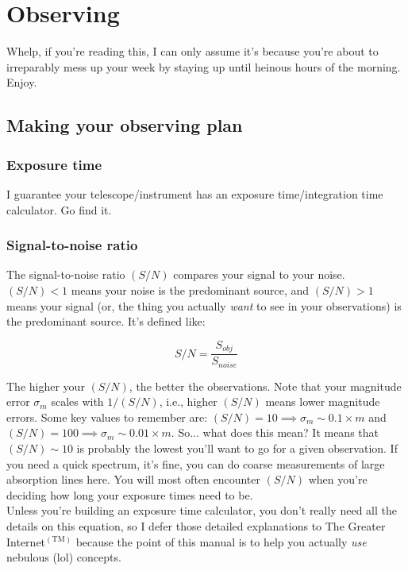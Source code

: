 \section{Observing}
Whelp, if you're reading this, I can only assume it's because you're about to irreparably mess up your week by staying up until heinous hours of the morning. Enjoy. 

\subsection{Making your observing plan}
\subsubsection{Exposure time}
I guarantee your telescope/instrument has an exposure time/integration time calculator. Go find it. 

\subsubsection{Signal-to-noise ratio}
The signal-to-noise ratio $(S/N)$ compares your signal to your noise. $(S/N) < 1$ means your noise is the predominant source, and $(S/N) > 1$ means your signal (or, the thing you actually \textit{want} to see in your observations) is the predominant source. It's defined like:

\begin{equation}
    S/N = \frac{S_{obj}}{S_{noise}}
\end{equation}

The higher your $(S/N)$, the better the observations. Note that your magnitude error $\sigma_{m}$ scales with $1/(S/N)$, i.e., higher $(S/N)$ means lower magnitude errors. Some key values to remember are: $(S/N) = 10 \implies \sigma_{m} \sim 0.1\times m$ and $(S/N) = 100 \implies \sigma_{m} \sim 0.01 \times m$. So... what does this mean? It means that $(S/N) \sim 10$ is probably the lowest you'll want to go for a given observation. If you need a quick spectrum, it's fine, you can do coarse measurements of large absorption lines here. You will most often encounter $(S/N)$ when you're deciding how long your exposure times need to be. \\

Unless you're building an exposure time calculator, you don't really need all the details on this equation, so I defer those detailed explanations to The Greater Internet$^{(\mathrm{TM})}$ because the point of this manual is to help you actually \textit{use} nebulous (lol) concepts.


